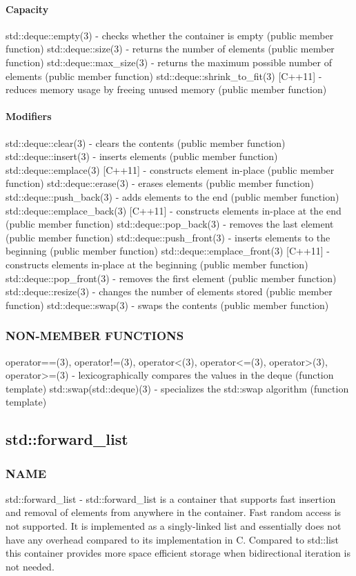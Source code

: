 \paragraph{Capacity}
std::deque::empty(3) - checks whether the container is empty   (public member function)
std::deque::size(3) - returns the number of elements   (public member function)
std::deque::max\_size(3) - returns the maximum possible number of elements   (public member function)
std::deque::shrink\_to\_fit(3) [C++11] - reduces memory usage by freeing unused memory   (public member function)
\paragraph{Modifiers}
std::deque::clear(3) - clears the contents   (public member function)
std::deque::insert(3) - inserts elements   (public member function)
std::deque::emplace(3) [C++11] - constructs element in-place   (public member function)
std::deque::erase(3) - erases elements   (public member function)
std::deque::push\_back(3) - adds elements to the end  (public member function)
std::deque::emplace\_back(3) [C++11] - constructs elements in-place at the end   (public member function)
std::deque::pop\_back(3) - removes the last element   (public member function)
std::deque::push\_front(3) - inserts elements to the beginning  (public member function)
std::deque::emplace\_front(3) [C++11] - constructs elements in-place at the beginning   (public member function)
std::deque::pop\_front(3) - removes the first element   (public member function)
std::deque::resize(3) - changes the number of elements stored   (public member function)
std::deque::swap(3) - swaps the contents   (public member function)

\subsubsection{NON-MEMBER FUNCTIONS}
operator==(3), operator!=(3), operator<(3), operator<=(3), operator>(3), operator>=(3) - lexicographically compares the values in the deque   (function template)
std::swap(std::deque)(3) - specializes the std::swap algorithm   (function template)


\subsection{std::forward\_list}

\subsubsection{NAME}
std::forward\_list - std::forward\_list is a container that supports fast insertion and removal of elements from anywhere in the container. Fast random access is not supported. It is implemented as a singly-linked list and essentially does not have any overhead compared to its implementation in C. Compared to std::list this container provides more space efficient storage when bidirectional iteration is not needed.

